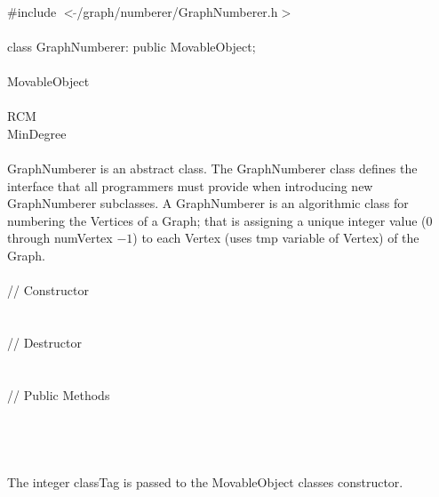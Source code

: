 

   \\
\indent \#include $<\tilde{ }$/graph/numberer/GraphNumberer.h$>$  \\

  \\
\indent class GraphNumberer: public MovableObject; \\

 \\
\indent MovableObject \\
\indent{} \\
\indent\indent\indent RCM \\
\indent\indent\indent MinDegree \\

  \\
\indent GraphNumberer is an abstract class. The GraphNumberer
class defines the interface that all programmers must provide when
introducing new GraphNumberer subclasses. A GraphNumberer is an
algorithmic class for numbering the Vertices of a Graph; that is
assigning a unique integer value ($0$ through \p numVertex $-1$) to
each Vertex (uses \p tmp variable of Vertex) of the Graph. \\


  \\
\indent // Constructor  \\
  \\ \\
\indent // Destructor  \\
  \\ \\
\indent // Public Methods   \\
\\
\\


  \\
  \\
The integer \p classTag is passed to the MovableObject classes
constructor.\\ 


